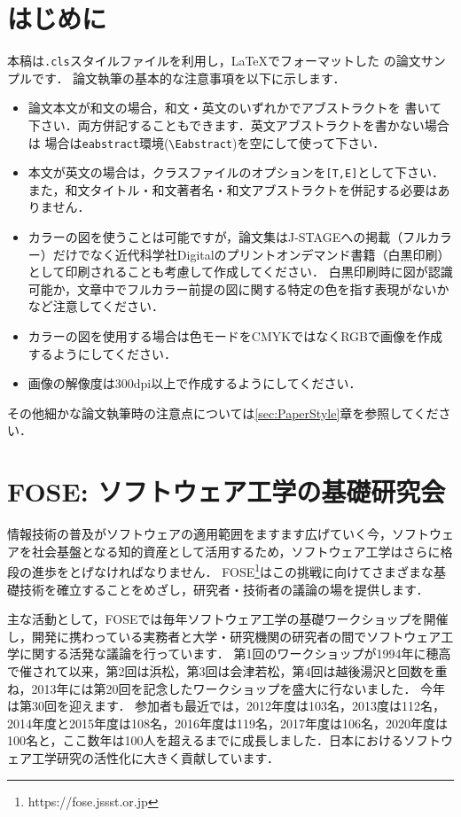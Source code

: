 \documentclass[T,J]{fose} %
\begin{document}
\section{はじめに}
本稿は{\tt \MakeLowercase{\foseabbrev}.cls}スタイルファイルを利用し，\LaTeX でフォーマットした \foseabbrev の論文サンプルです．
論文執筆の基本的な注意事項を以下に示します．
\begin{itemize}
\item 論文本文が和文の場合，和文・英文のいずれかでアブストラクトを
書いて下さい．両方併記することもできます．英文アブストラクトを書かない場合は
場合は{\tt eabstract}環境(\verb|\Eabstract|)を空にして使って下さい．
\item 本文が英文の場合は，クラスファイルのオプションを{\verb|[T,E]|}として下さい．
また，和文タイトル・和文著者名・和文アブストラクトを併記する必要はありません．
\item カラーの図を使うことは可能ですが，論文集はJ-STAGEへの掲載（フルカラー）だけでなく近代科学社Digitalのプリントオンデマンド書籍（白黒印刷）として印刷されることも考慮して作成してください．
白黒印刷時に図が認識可能か，文章中でフルカラー前提の図に関する特定の色を指す表現がないかなど注意してください．
\item カラーの図を使用する場合は色モードをCMYKではなくRGBで画像を作成するようにしてください．
\item 画像の解像度は300dpi以上で作成するようにしてください．
\end{itemize}
その他細かな論文執筆時の注意点については\ref{sec:PaperStyle}章を参照してください．

\section{FOSE: ソフトウェア工学の基礎研究会}
情報技術の普及がソフトウェアの適用範囲をますます広げていく今，ソフトウェアを社会基盤となる知的資産として活用するため，ソフトウェア工学はさらに格段の進歩をとげなければなりません．
FOSE\footnote{https://fose.jssst.or.jp}はこの挑戦に向けてさまざまな基礎技術を確立することをめざし，研究者・技術者の議論の場を提供します．

主な活動として，FOSEでは毎年ソフトウェア工学の基礎ワークショップを開催し，開発に携わっている実務者と大学・研究機関の研究者の間でソフトウェア工学に関する活発な議論を行っています．
第1回のワークショップが1994年に穂高で催されて以来，第2回は浜松，第3回は会津若松，第4回は越後湯沢と回数を重ね，2013年には第20回を記念したワークショップを盛大に行ないました．
今年は第30回を迎えます．
参加者も最近では，2012年度は103名，2013度は112名，2014年度と2015年度は108名，2016年度は119名，2017年度は106名，2020年度は100名と，ここ数年は100人を超えるまでに成長しました．日本におけるソフトウェア工学研究の活性化に大きく貢献しています．
\end{document}
